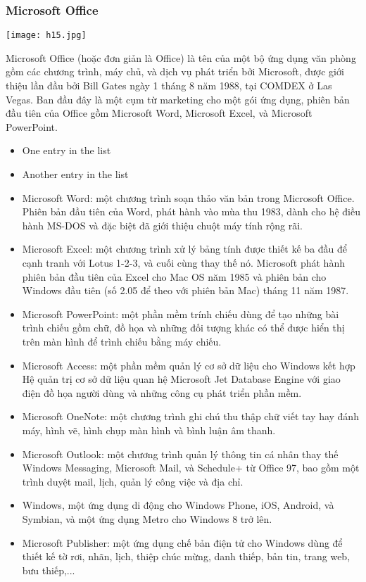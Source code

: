 \documentclass[12pt,a4paper]{article}  %
\begin{document}
\subsubsection{Microsoft Office}
\begin{center}
	\texttt{[image: h15.jpg]}
\end{center}
Microsoft Office (hoặc đơn giản là Office) là tên của một bộ ứng dụng văn phòng gồm các chương trình, máy chủ, và dịch vụ phát triển bởi Microsoft, được giới thiệu lần đầu bởi Bill Gates ngày 1 tháng 8 năm 1988, tại COMDEX ở Las Vegas. Ban đầu đây là một cụm từ marketing cho một gói ứng dụng, phiên bản đầu tiên của Office gồm Microsoft Word, Microsoft Excel, và Microsoft PowerPoint.
\begin{itemize}
	\item One entry in the list
	\item Another entry in the list
\item Microsoft Word: một chương trình soạn thảo văn bản trong Microsoft Office. Phiên bản đầu tiên của Word, phát hành vào mùa thu 1983, dành cho hệ điều hành MS-DOS và đặc biệt đã giới thiệu chuột máy tính rộng rãi.
\item Microsoft Excel: một chương trình xử lý bảng tính được thiết kế ba đầu để cạnh tranh với Lotus 1-2-3, và cuối cùng thay thế nó. Microsoft phát hành phiên bản đầu tiên của Excel cho Mac OS năm 1985 và phiên bản cho Windows đầu tiên (số 2.05 để theo với phiên bản Mac) tháng 11 năm 1987.
\item Microsoft PowerPoint: một phần mềm trính chiếu dùng để tạo những bài trình chiếu gồm chữ, đồ họa và những đối tượng khác có thể được hiển thị trên màn hình để trình chiếu bằng máy chiếu.
\item Microsoft Access: một phần mềm quản lý cơ sở dữ liệu cho Windows kết hợp Hệ quản trị cơ sở dữ liệu quan hệ Microsoft Jet Database Engine với giao điện đồ họa người dùng và những công cụ phát triển phần mềm.
\item Microsoft OneNote: một chương trình ghi chú thu thập chữ viết tay hay đánh máy, hình vẽ, hình chụp màn hình và bình luận âm thanh.
\item Microsoft Outlook: một chương trình quản lý thông tin cá nhân thay thế Windows Messaging, Microsoft Mail, và Schedule+ từ Office 97, bao gồm một trình duyệt mail, lịch, quản lý công việc và địa chỉ.
\item Windows, một ứng dụng di động cho Windows Phone, iOS, Android, và Symbian, và một ứng dụng Metro cho Windows 8 trở lên.
\item Microsoft Publisher: một ứng dụng chế bản điện tử cho Windows dùng để thiết kế tờ rơi, nhãn, lịch, thiệp chúc mừng, danh thiếp, bản tin, trang web, bưu thiếp,...

\end{itemize}
\end{document}

